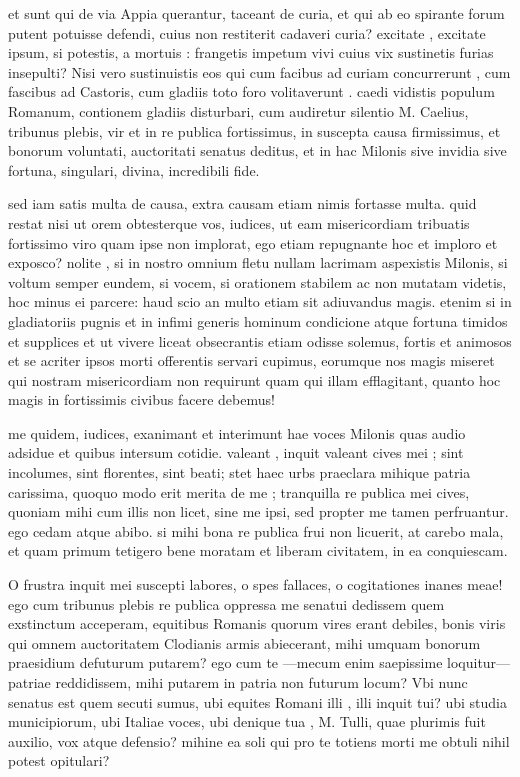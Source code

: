  et sunt qui de via Appia querantur, taceant de curia, et qui ab eo spirante forum putent potuisse defendi, cuius non restiterit cadaveri curia? excitate , excitate ipsum, si potestis, a mortuis : frangetis impetum vivi cuius vix sustinetis furias insepulti? Nisi vero sustinuistis eos qui cum facibus ad curiam concurrerunt , cum fascibus ad Castoris, cum gladiis toto foro volitaverunt . caedi vidistis populum Romanum, contionem gladiis disturbari, cum audiretur silentio M. Caelius, tribunus plebis, vir et in re publica fortissimus, in suscepta causa firmissimus, et bonorum voluntati, auctoritati senatus deditus, et in hac Milonis sive invidia sive fortuna, singulari, divina, incredibili fide.

 sed iam satis multa de causa, extra causam etiam nimis fortasse multa. quid restat nisi ut orem obtesterque vos, iudices, ut eam misericordiam tribuatis fortissimo viro quam ipse non implorat, ego etiam repugnante hoc et imploro et exposco? nolite , si in nostro omnium fletu nullam lacrimam aspexistis Milonis, si voltum semper eundem, si vocem, si orationem stabilem ac non mutatam videtis, hoc minus ei parcere: haud scio an multo etiam sit adiuvandus magis. etenim si in gladiatoriis pugnis et in infimi generis hominum condicione atque fortuna timidos et supplices et ut vivere liceat obsecrantis etiam odisse solemus, fortis et animosos et se acriter ipsos morti offerentis servari cupimus, eorumque nos magis miseret qui nostram misericordiam non requirunt quam qui illam efflagitant, quanto hoc magis in fortissimis civibus facere debemus!

 me quidem, iudices, exanimant et interimunt hae voces Milonis quas audio adsidue et quibus intersum cotidie. valeant , inquit valeant cives mei ; sint incolumes, sint florentes, sint beati; stet haec urbs praeclara mihique patria carissima, quoquo modo erit merita de me ; tranquilla re publica mei cives, quoniam mihi cum illis non licet, sine me ipsi, sed propter me tamen perfruantur. ego cedam atque abibo. si mihi bona re publica frui non licuerit, at carebo mala, et quam primum tetigero bene moratam et liberam civitatem, in ea conquiescam.

 O frustra inquit mei suscepti labores, o spes fallaces, o cogitationes inanes meae! ego cum tribunus plebis re publica oppressa me senatui dedissem quem exstinctum acceperam, equitibus Romanis quorum vires erant debiles, bonis viris qui omnem auctoritatem Clodianis armis abiecerant, mihi umquam bonorum praesidium defuturum putarem? ego cum te —mecum enim saepissime loquitur— patriae reddidissem, mihi putarem in patria non futurum locum? Vbi nunc senatus est quem secuti sumus, ubi equites Romani illi , illi inquit tui? ubi studia municipiorum, ubi Italiae voces, ubi denique tua , M. Tulli, quae plurimis fuit auxilio, vox atque defensio? mihine ea soli qui pro te totiens morti me obtuli nihil potest opitulari?

